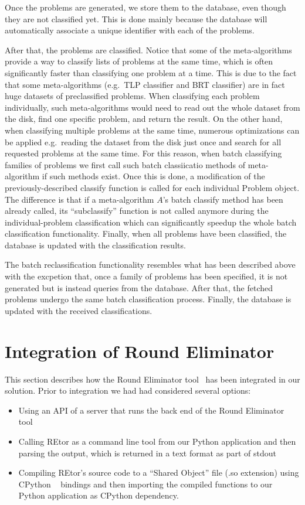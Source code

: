 Once the problems are generated, we store them to the database,
even though they are not classified yet. This is done mainly
because the database will automatically associate a unique
identifier with each of the problems.

After that, the problems are classified. Notice that
some of the meta-algorithms provide a way to classify
lists of problems at the same time, which is often
significantly faster than classifying one problem at a time.
This is due to the fact that some meta-algorithms
(e.g.\ TLP classifier and BRT classifier) are in fact
huge datasets of preclassified problems. When
classifying each problem individually, such
meta-algorithms would need to read out the whole
dataset from the disk, find one specific problem,
and return the result. On the other hand, when
classifying multiple problems at the same time,
numerous optimizations can be applied e.g.\ reading the 
dataset from the disk just once and search for all
requested problems at the same time. For this reason,
when batch classifying families of problems we first
call such batch classiicatio methods of meta-algorithm
if such methods exist. Once this is done, a modification
of the previously-described classify function is called
for each individual Problem object. The difference is
that if a meta-algorithm $A$'s batch classify method has been
already called, its ``subclassify'' function is not called
anymore during the individual-problem classification which
can significantly speedup the whole batch classification
functionality. Finally, when all problems have been classified,
the database is updated with the classification results.

The batch reclassification functionality resembles
what has been described above with the excpetion that,
once a family of problems has been specified, it is
not generated but is instead queries from the database.
After that, the fetched problems undergo the same
batch classification process. Finally, the database is
updated with the received classifications.

\section{Integration of Round Eliminator}

This section describes how the Round Eliminator
tool~\cite{Olivetti2020} has been integrated in our solution.
Prior to integration we had had considered several options:

\begin{itemize}
  \item Using an API of a server that runs the back end of the Round Eliminator tool
  \item Calling REtor as a command line tool from our Python
  application and then parsing the output, which is returned
  in a text format as part of stdout~\cite{stdio}
  \item Compiling REtor's source code to a ``Shared Object'' file (.so extension)
  using CPython ~\cite{CPython} bindings and then importing the compiled
  functions to our Python application as CPython dependency.
\end{itemize}

